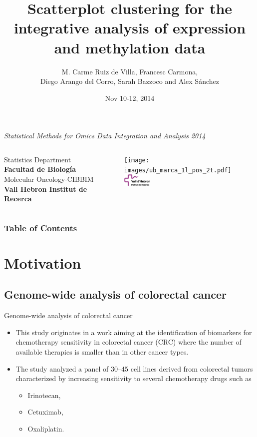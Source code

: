 \documentclass[handout]{beamer}
\title[Scatterplot clustering]{Scatterplot clustering for the integrative analysis of expression and methylation data}
\author[Álex Sánchez]{M. Carme Ruiz de Villa, Francesc Carmona, \\ Diego Arango del Corro, Sarah Bazzoco and Alex Sánchez}
\date[]{Nov 10-12, 2014}
\begin{document}
\begin{frame}
\begin{scriptsize}
\begin{center}
  \emph{ Statistical Methods for Omics Data Integration and Analysis 2014}
\end{center}
\end{scriptsize}

\titlepage

\begin{columns}
   \scriptsize
   Statistics Department  \\ \textbf{Facultad de Biología}\\
   Molecular Oncology-CIBBIM \\ \textbf{Vall Hebron Institut de Recerca}

  \hfill{}
  \texttt{[image: images/ub\_marca\_1l\_pos\_2t.pdf]}\\
 \includegraphics[height=0.6cm]{images/VHIR_fonstransp.png}

\end{columns}
\end{frame}


\begin{frame}
\frametitle{Table of Contents}
\tableofcontents
\end{frame}

\section{Motivation}

\subsection{Genome-wide analysis of colorectal cancer}

\begin{frame}{Genome-wide analysis of colorectal cancer}
  \begin{itemize}
  \item This study originates in a work aiming at the identification of biomarkers for chemotherapy sensitivity in colorectal cancer (CRC) where the number of available therapies is smaller than in other cancer types.
  \item The study analyzed a panel of 30--45 cell lines derived from colorectal tumors characterized by increasing sensitivity to several chemotherapy drugs such as \begin{itemize}
                \item Irinotecan,
                \item Cetuximab,
                \item Oxaliplatin.
              \end{itemize}
  \end{itemize}
\end{frame}
\end{document}
